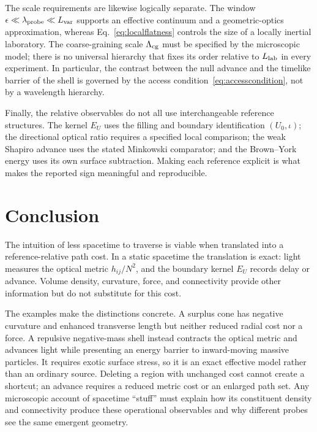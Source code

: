 \documentclass[aps,prd,twocolumn,amsmath,amssymb,nofootinbib]{revtex4-2}
\begin{document}
The scale requirements are likewise logically separate.  The window
$\epsilon\ll\lambda_{\rm probe}\ll L_{\rm var}$ supports an effective
continuum and a geometric-optics approximation, whereas
Eq.~\eqref{eq:localflatness} controls the size of a locally inertial
laboratory.  The coarse-graining scale $\Lambda_{\rm cg}$ must be specified by
the microscopic model; there is no universal hierarchy that fixes its order
relative to $L_{\rm lab}$ in every experiment.  In particular, the contrast
between the null advance and the timelike barrier of the shell is governed by
the access condition~\eqref{eq:accesscondition}, not by a wavelength
hierarchy.

Finally, the relative observables do not all use interchangeable reference
structures.  The kernel $E_U$ uses the filling and boundary identification
$(U_0,\iota)$; the directional optical ratio requires a specified local
comparison; the weak Shapiro advance uses the stated Minkowski comparator; and
the Brown--York energy uses its own surface subtraction.  Making each reference
explicit is what makes the reported sign meaningful and reproducible.

\section{Conclusion}
\label{sec:conclusion}

The intuition of less spacetime to traverse is viable when translated into a
reference-relative path cost.  In a static spacetime the translation is exact:
light measures the optical metric $h_{ij}/N^2$, and the boundary kernel
$E_U$ records delay or advance.  Volume density, curvature, force, and
connectivity provide other information but do not substitute for this cost.

The examples make the distinctions concrete.  A surplus cone has negative
curvature and enhanced transverse length but neither reduced radial cost nor a
force.  A repulsive negative-mass shell instead contracts the optical metric
and advances light while presenting an energy barrier to inward-moving massive
particles.  It requires exotic surface stress, so it is an exact effective
model rather than an ordinary source.  Deleting a region with unchanged cost
cannot create a shortcut; an advance requires a reduced metric cost or an
enlarged path set.  Any microscopic account of spacetime ``stuff'' must explain
how its constituent density and connectivity produce these operational
observables and why different probes see the same emergent geometry.
\end{document}
